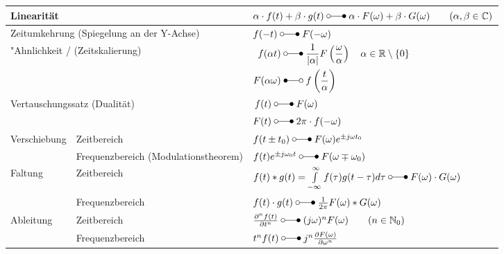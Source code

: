 	
	\renewcommand{\arraystretch}{2}
	\begin{tabular}{|p{3cm}|p{6.5cm}p{8.5cm}|}
		\hline
			\multicolumn{2}{|l}{Linearität} & $\alpha\cdot f(t) + \beta\cdot g(t) \; \laplace \; \alpha\cdot F(\omega) +\beta\cdot G(\omega) \qquad (\alpha, \beta \in \mathbb{C})$  \\ 
		\hline
			\multicolumn{2}{|l}{Zeitumkehrung (Spiegelung an der Y-Achse)} & $f(-t) \; \laplace \; F(-\omega)$ \\
		\hline
			\multicolumn{2}{|l}{"Ahnlichkeit / (Zeitskalierung)}             &      		$\begin{aligned}f(\alpha t) \; &\laplace \; \frac{1}{|\alpha|}F \left (\frac{\omega}{\alpha} \right)
				     		\quad\alpha \in\mathbb{R}\setminus \{0\}\\
				     		F(\alpha\omega) \; &\Laplace \; f\left(\frac{t}{\alpha}\right)\end{aligned}$\\ 
		\hline
			\multicolumn{2}{|l}{Vertauschungssatz (Dualität)}              & 
			\begin{math}
				\begin{aligned}
					f(t) \; &\laplace \; F(\omega)\nonumber \\ 
					F(t) \; &\laplace \; 2\pi \cdot f(-\omega)
				\end{aligned}
			\end{math}\\ 
		\hline
		\hline
			\multirow{2}{*}{Verschiebung} & Zeitbereich & $f(t\pm t_0) \; \laplace \; F(\omega)e^{\pm j\omega t_0}$ \\ 
			\cline{2-3} 
			& Frequenzbereich (Modulationstheorem) & $f(t)e^{\pm j\omega_0 t} \; \laplace \; F(\omega\mp\omega_0)$ \\ 
		\hline
		\hline
			\multirow{2}{*}{Faltung} & Zeitbereich & $f(t) \ast g(t) = \int\limits_{-\infty}^{\infty} f(\tau)g(t-\tau)d\tau \; \laplace \;
			F(\omega) \cdot G(\omega)$ \\ 
			\cline{2-3} 
			& Frequenzbereich & $f(t) \cdot g(t) \; \laplace \; \frac{1}{2\pi}F(\omega) \ast G(\omega)$ \\ 
   		\hline
   		\hline
   	   		\multirow{2}{*}{Ableitung} & Zeitbereich & $\frac{\partial^n f(t)}{\partial t^n} \; \laplace \; (j\omega)^n F(\omega) \qquad (n \in \mathbb{N}_0)$ \\ 
	   		\cline{2-3} 
	   		& Frequenzbereich &  $t^n f(t) \; \laplace \; j^n \frac{\partial F(\omega)}{\partial \omega^n}$\\ 
   		\hline
   		\hline

\end{tabular}
